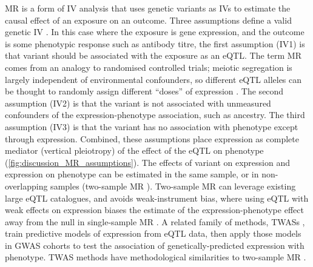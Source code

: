 \gls{MR} is a form of \gls{IV} analysis that uses genetic variants as \glspl{IV} to estimate the causal effect of an exposure on an outcome.
Three assumptions define a valid genetic \gls{IV} \autocite{daveysmith2014MendelianRandomizationGenetic,hemani2018EvaluatingPotentialRole,neumeyer2020StrengtheningCausalInference}.
In this case where the exposure is gene expression, and the outcome is some phenotypic response such as antibody titre,
the first assumption (IV1) is that variant should be associated with the exposure as an \gls{eQTL}.
The term \gls{MR} comes from an analogy to randomised controlled trials;
meiotic segregation is largely independent of environmental confounders, 
so different \gls{eQTL} alleles can be thought to randomly assign different \enquote{doses} of expression \autocite{daveysmith2014MendelianRandomizationGenetic}.
The second assumption (IV2) is that the variant is not associated with unmeasured confounders of the expression-phenotype association, such as ancestry.
The third assumption (IV3) is that the variant has no association with phenotype except through expression. 
Combined, these assumptions place expression as complete mediator (vertical pleiotropy) of the effect of the \gls{eQTL} on phenotype (\cref{fig:discussion_MR_assumptions}).
The effects of variant on expression and expression on phenotype can be estimated in the same sample, 
or in non-overlapping samples (two-sample \gls{MR} \autocite{hemani2018EvaluatingPotentialRole,neumeyer2020StrengtheningCausalInference}).
Two-sample \gls{MR} can leverage existing large \gls{eQTL} catalogues,
and avoids weak-instrument bias, where using \gls{eQTL} with weak effects on expression biases the estimate of the expression-phenotype effect away from the null in single-sample \gls{MR} \autocite{daveysmith2020MendelLawsMendelian}.
%
A related family of methods,
\glspl{TWAS} \autocite{gusev2016IntegrativeApproachesLargescale},
train predictive models of expression from \gls{eQTL} data, 
then apply those models in \gls{GWAS} cohorts to test the association of genetically-predicted expression with phenotype.
\gls{TWAS} methods have methodological similarities to two-sample \gls{MR} \autocite{zhu2020TranscriptomewideAssociationStudies}.


